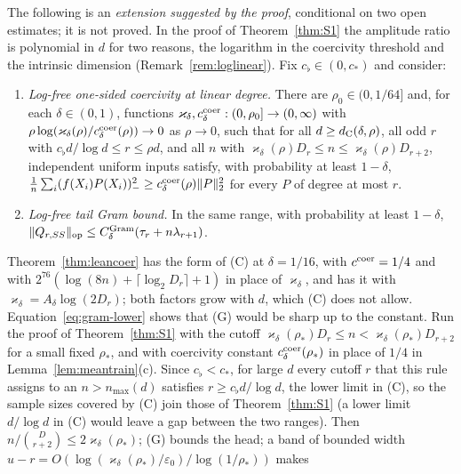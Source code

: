 \begin{remark}\label{rem:CG}
The following is an \emph{extension suggested by the proof}, conditional on
two open estimates; it is not proved. In the proof of
Theorem~\ref{thm:S1} the amplitude ratio is polynomial in $d$ for two
reasons, the logarithm in the coercivity threshold and the intrinsic
dimension (Remark~\ref{rem:loglinear}). Fix $c_\flat\in(0,c_*)$ and
consider:
\begin{enumerate}
\item[(C)] \emph{Log-free one-sided coercivity at linear degree.} There are
$\rho_0\in(0,1/64]$ and, for each $\delta\in(0,1)$, functions
$\varkappa_\delta,c^{\rm coer}_\delta:(0,\rho_0]\to(0,\infty)$ with
$\rho\log(\varkappa_\delta(\rho)/c^{\rm coer}_\delta(\rho))\to0$ as
$\rho\to0$, such that for all $d\ge d_{\rm C}(\delta,\rho)$, all odd $r$
with $c_\flat d/\log d\le r\le\rho d$, and all $n$ with
$\varkappa_\delta(\rho)D_r\le n\le\varkappa_\delta(\rho)D_{r+2}$,
independent uniform inputs satisfy, with probability at least $1-\delta$,
$\frac1n\sum_i(f(X_i)P(X_i))_-^2\ge c^{\rm coer}_\delta(\rho)\|P\|_2^2$ for
every $P$ of degree at most $r$.
\item[(G)] \emph{Log-free tail Gram bound.} In the same range, with
probability at least $1-\delta$,
$\|Q_{r,SS}\|_{\rm op}\le C^{\rm Gram}_\delta(\tau_r+n\lambda_{r+1})$.
\end{enumerate}
Theorem~\ref{thm:leancoer} has the form of (C) at $\delta=1/16$, with
$c^{\rm coer}=1/4$ and with $2^{76}(\log(8n)+\lceil\log_2D_r\rceil+1)$ in
place of $\varkappa_\delta$, and \cite[Lemma~4.4]{subcritical} has it with
$\varkappa_\delta=A_\delta\log(2D_r)$; both factors grow with $d$, which
(C) does not allow.
Equation~\eqref{eq:gram-lower} shows that (G) would be sharp up to the
constant. Run the proof of Theorem~\ref{thm:S1} with the cutoff
$\varkappa_\delta(\rho_*)D_r\le n<\varkappa_\delta(\rho_*)D_{r+2}$ for a
small fixed $\rho_*$, and with coercivity constant
$c^{\rm coer}_\delta(\rho_*)$ in place of $1/4$ in
Lemma~\ref{lem:meantrain}(c). Since $c_\flat<c_*$, for large $d$ every
cutoff $r$ that this rule assigns to an $n>n_{\max}(d)$ satisfies
$r\ge c_\flat d/\log d$, the lower limit in (C), so the sample sizes
covered by (C) join those of Theorem~\ref{thm:S1} (a lower limit
$d/\log d$ in (C) would leave a gap between the two ranges). Then
$n/\binom D{r+2}\le2\varkappa_\delta(\rho_*)$; (G) bounds the head; a band
of bounded width
$u-r=O(\log(\varkappa_\delta(\rho_*)/\varepsilon_0)/\log(1/\rho_*))$ makes

\end{remark}
